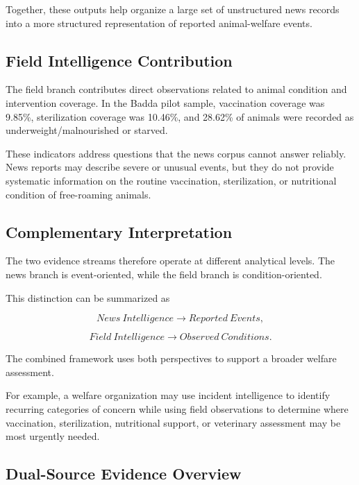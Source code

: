 \documentclass[conference]{IEEEtran}
\begin{document}
Together, these outputs help organize a large set of unstructured news records
into a more structured representation of reported animal-welfare events.

\subsection{Field Intelligence Contribution}

The field branch contributes direct observations related to animal condition
and intervention coverage. In the Badda pilot sample, vaccination coverage
was 9.85\%, sterilization coverage was 10.46\%, and 28.62\% of animals were
recorded as underweight/malnourished or starved.

These indicators address questions that the news corpus cannot answer
reliably. News reports may describe severe or unusual events, but they do not
provide systematic information on the routine vaccination, sterilization, or
nutritional condition of free-roaming animals.

\subsection{Complementary Interpretation}

The two evidence streams therefore operate at different analytical levels.
The news branch is event-oriented, while the field branch is
condition-oriented.

This distinction can be summarized as

\begin{equation}
News\ Intelligence \rightarrow Reported\ Events,
\end{equation}

\begin{equation}
Field\ Intelligence \rightarrow Observed\ Conditions.
\end{equation}

The combined framework uses both perspectives to support a broader welfare
assessment.

For example, a welfare organization may use incident intelligence to identify
recurring categories of concern while using field observations to determine
where vaccination, sterilization, nutritional support, or veterinary
assessment may be most urgently needed.

\subsection{Dual-Source Evidence Overview}
\end{document}
